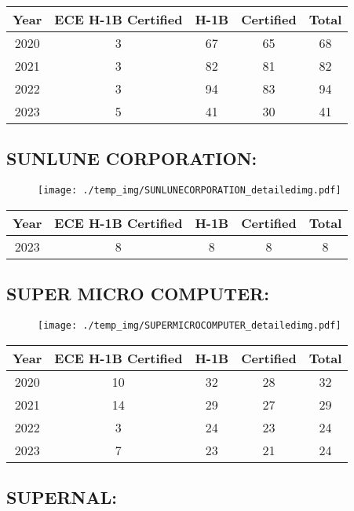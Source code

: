 \documentclass{article}%
\begin{document}
%
\begin{longtable}{c|c|c|c|c}%
\hline%
Year&ECE H{-}1B Certified&H{-}1B&Certified&Total\\%
\hline%
2020&3&67&65&68\\%
\hline%
2021&3&82&81&82\\%
\hline%
2022&3&94&83&94\\%
\hline%
2023&5&41&30&41\\%
\hline%
\end{longtable}

%
\newpage%
\subsection{SUNLUNE CORPORATION:}%
\label{subsec:SUNLUNECORPORATION}%
\label{SUNLUNECORPORATIONdetailed}%


\begin{figure}[htbp]%
\centering%
\texttt{[image: ./temp\_img/SUNLUNECORPORATION\_detailedimg.pdf]}%
\end{figure}

%
\begin{longtable}{c|c|c|c|c}%
\hline%
Year&ECE H{-}1B Certified&H{-}1B&Certified&Total\\%
\hline%
2023&8&8&8&8\\%
\hline%
\end{longtable}

%
\newpage%
\subsection{SUPER MICRO COMPUTER:}%
\label{subsec:SUPERMICROCOMPUTER}%
\label{SUPERMICROCOMPUTERdetailed}%


\begin{figure}[htbp]%
\centering%
\texttt{[image: ./temp\_img/SUPERMICROCOMPUTER\_detailedimg.pdf]}%
\end{figure}

%
\begin{longtable}{c|c|c|c|c}%
\hline%
Year&ECE H{-}1B Certified&H{-}1B&Certified&Total\\%
\hline%
2020&10&32&28&32\\%
\hline%
2021&14&29&27&29\\%
\hline%
2022&3&24&23&24\\%
\hline%
2023&7&23&21&24\\%
\hline%
\end{longtable}

%
\newpage%
\subsection{SUPERNAL:}%
\label{subsec:SUPERNAL}%
\label{SUPERNALdetailed}%
\end{document}
